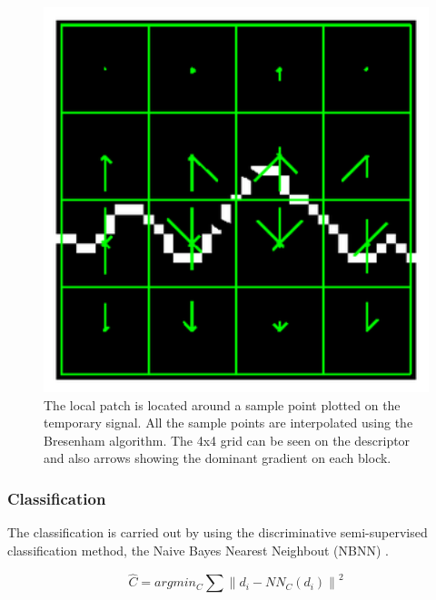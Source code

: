 \documentclass[entropy,article,submit,moreauthors,pdftex,10pt,a4paper]{mdpi}
\begin{document}
\begin{figure}[H]
\centering
\includegraphics[width=16cm]{sampledescriptor.eps}
\caption{The local patch is located around a sample point plotted on the temporary signal. All the sample points are interpolated using the Bresenham algorithm. The 4x4 grid can be seen on the descriptor and also arrows showing the dominant gradient on each block.}
\label{fig:sampledescriptor}
\end{figure}


\subsubsection{Classification}

The classification is carried out by using the discriminative semi-supervised classification method, the Naive Bayes Nearest Neighbout (NBNN) \citep{Boiman2008}. %

\begin{equation}
\hat{C} = argmin_C \sum_{}^{} \left\lVert d_i - NN_C(d_i) \right\rVert ^2
\end{equation}

\end{document}
